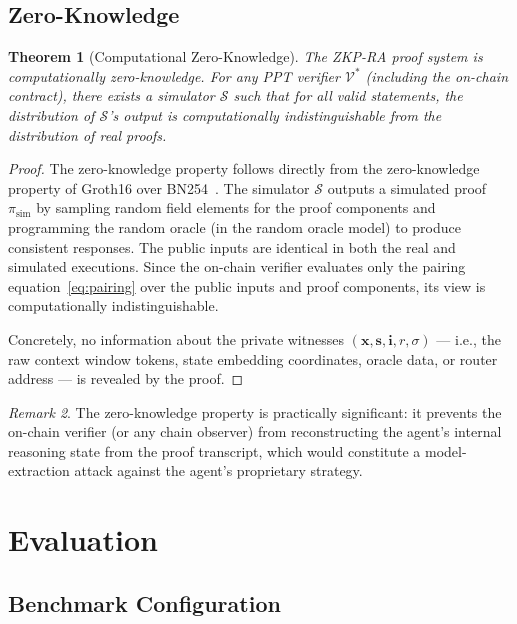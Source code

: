 \documentclass[final,5p,times,twocolumn]{elsarticle}
\theoremstyle{plain}
\newtheorem{theorem}{Theorem}[section]
\theoremstyle{definition}
\theoremstyle{remark}
\newtheorem{remark}[theorem]{Remark}
\newcommand{\Sim}{\mathcal{S}}
\begin{document}
\subsection{Zero-Knowledge}
\label{sec:zk}

\begin{theorem}[Computational Zero-Knowledge]
\label{thm:zk}
The ZKP-RA proof system is computationally zero-knowledge. For any PPT
verifier $\mathcal{V}^*$ (including the on-chain contract), there exists a
simulator $\Sim$ such that for all valid statements, the distribution of
$\Sim$'s output is computationally indistinguishable from the distribution of
real proofs.
\end{theorem}

\begin{proof}
The zero-knowledge property follows directly from the zero-knowledge property
of Groth16 over BN254~\cite{vcnn2024}. The simulator $\Sim$ outputs a simulated
proof $\pi_{\mathrm{sim}}$ by sampling random field elements for the proof
components and programming the random oracle (in the random oracle model) to
produce consistent responses. The public inputs are identical in both the real
and simulated executions. Since the on-chain verifier evaluates only the
pairing equation~\cref{eq:pairing} over the public inputs and proof components,
its view is computationally indistinguishable.

Concretely, no information about the private witnesses $(\mathbf{x}, \mathbf{s},
\mathbf{i}, r, \sigma)$ --- i.e., the raw context window tokens, state
embedding coordinates, oracle data, or router address --- is revealed by
the proof.
\end{proof}

\begin{remark}
The zero-knowledge property is practically significant: it prevents the
on-chain verifier (or any chain observer) from reconstructing the agent's
internal reasoning state from the proof transcript, which would constitute
a model-extraction attack against the agent's proprietary strategy.
\end{remark}

\section{Evaluation}
\label{sec:eval}

\subsection{Benchmark Configuration}
\end{document}
